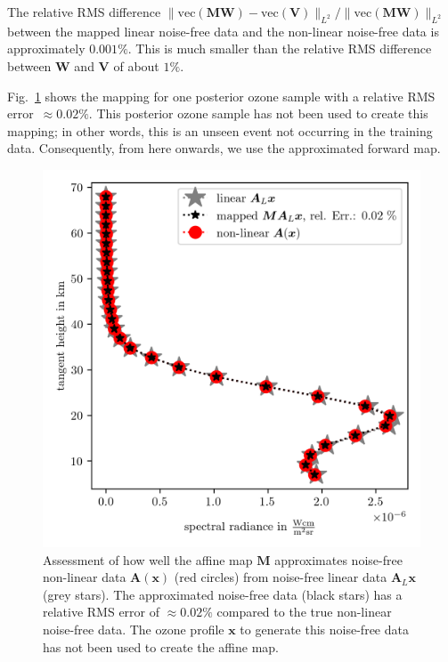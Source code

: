 The relative RMS difference $\lVert \text{vec}(\bm{M}\bm{W}) - \text{vec}(\bm{V})  \rVert_{L^2} / \lVert \text{vec}(\bm{M}\bm{W}) \rVert_{L^2} $ between the mapped linear noise-free data and the non-linear noise-free data is approximately $0.001\%$.
This is much smaller than the relative RMS difference between $\bm{W}$ and $\bm{V}$ of about $1\%$.

Fig.~\ref{fig:MapAsses} shows the mapping for one posterior ozone sample with a relative RMS error~$\approx0.02\%$.
This posterior ozone sample has not been used to create this mapping; in other words, this is an unseen event not occurring in the training data.
Consequently, from here onwards, we use the approximated forward map.
\begin{figure}[ht!]
	\centering
	\includegraphics{SampMapAssesmentTT.png}
	\caption[Assessment of affine map.]{Assessment of how well the affine map $\bm{M}$ approximates noise-free non-linear data $\bm{A}(\bm{x})$ (red circles) from noise-free linear data $\bm{A}_L\bm{x}$ (grey stars). The approximated noise-free data (black stars) has a relative RMS error of $\approx 0.02\%$ compared to the true non-linear noise-free data.
		The ozone profile $\bm{x}$ to generate this noise-free data has not been used to create the affine map.}
	\label{fig:MapAsses}
\end{figure}
\clearpage

